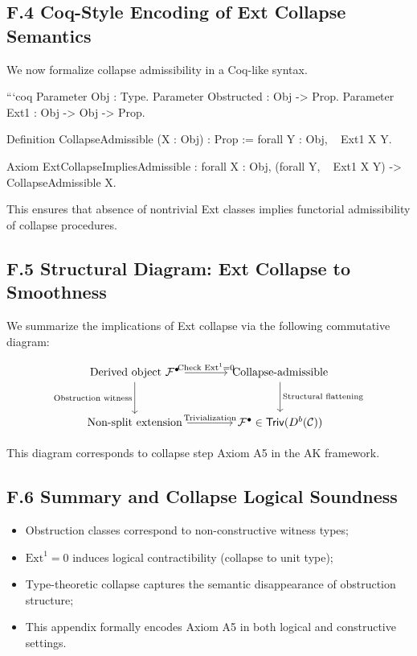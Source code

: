 \documentclass[11pt]{article}
\begin{document}
\subsection*{F.4 Coq-Style Encoding of Ext Collapse Semantics}

We now formalize collapse admissibility in a Coq-like syntax.

```coq
Parameter Obj : Type.
Parameter Obstructed : Obj -> Prop.
Parameter Ext1 : Obj -> Obj -> Prop.

Definition CollapseAdmissible (X : Obj) : Prop :=
  forall Y : Obj,
    ~ Ext1 X Y.

Axiom ExtCollapseImpliesAdmissible :
  forall X : Obj,
    (forall Y, ~ Ext1 X Y) ->
    CollapseAdmissible X.

This ensures that absence of nontrivial Ext classes implies
functorial admissibility of collapse procedures.

\subsection*{F.5 Structural Diagram: Ext Collapse to Smoothness}

We summarize the implications of Ext collapse via the following commutative diagram:

\[
\begin{tikzcd}[column sep=large, row sep=large]
\text{Derived object } \mathcal{F}^\bullet \arrow[r, "\text{Check } \mathrm{Ext}^1 = 0"] \arrow[d, swap, "\text{Obstruction witness}"]
& \text{Collapse-admissible} \arrow[d, "\text{Structural flattening}"] \\
\text{Non-split extension} \arrow[r, "\text{Trivialization}"]
& \mathcal{F}^\bullet \in \mathsf{Triv}(D^b(\mathcal{C}))
\end{tikzcd}
\]


This diagram corresponds to collapse step Axiom A5 in the AK framework.

\subsection*{F.6 Summary and Collapse Logical Soundness}

\begin{itemize}
  \item Obstruction classes correspond to non-constructive witness types;
  \item \( \mathrm{Ext}^1 = 0 \) induces logical contractibility (collapse to unit type);
  \item Type-theoretic collapse captures the semantic disappearance of obstruction structure;
  \item This appendix formally encodes Axiom A5 in both logical and constructive settings.
\end{itemize}
\end{document}
